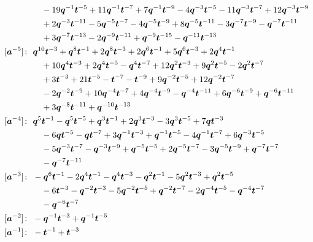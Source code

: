 \begin{align*}
& \quad -19 \bq^{-1} \bt^{-5} +11 \bq^{-1} \bt^{-7} +7 \bq^{-1} \bt^{-9} -4 \bq^{-3} \bt^{-5} -11 \bq^{-3} \bt^{-7} +12 \bq^{-3} \bt^{-9} \\
& \quad +2 \bq^{-3} \bt^{-11} -5 \bq^{-5} \bt^{-7} -4 \bq^{-5} \bt^{-9} +8 \bq^{-5} \bt^{-11} -3 \bq^{-7} \bt^{-9} -\bq^{-7} \bt^{-11} \\
& \quad +3 \bq^{-7} \bt^{-13} -2 \bq^{-9} \bt^{-11} +\bq^{-9} \bt^{-15} -\bq^{-11} \bt^{-13} \\
[\ba^{-5}]\colon\ & \bq^{10} \bt^{-3} +\bq^{8} \bt^{-1} +2 \bq^{8} \bt^{-3} +2 \bq^{6} \bt^{-1} +5 \bq^{6} \bt^{-3} +2 \bq^{4} \bt^{-1} \\
& \quad +10 \bq^{4} \bt^{-3} +2 \bq^{4} \bt^{-5} -\bq^{4} \bt^{-7} +12 \bq^{2} \bt^{-3} +9 \bq^{2} \bt^{-5} -2 \bq^{2} \bt^{-7} \\
& \quad +3 \bt^{-3} +21 \bt^{-5} -\bt^{-7} -\bt^{-9} +9 \bq^{-2} \bt^{-5} +12 \bq^{-2} \bt^{-7} \\
& \quad -2 \bq^{-2} \bt^{-9} +10 \bq^{-4} \bt^{-7} +4 \bq^{-4} \bt^{-9} -\bq^{-4} \bt^{-11} +6 \bq^{-6} \bt^{-9} +\bq^{-6} \bt^{-11} \\
& \quad +3 \bq^{-8} \bt^{-11} +\bq^{-10} \bt^{-13} \\
[\ba^{-4}]\colon\ & \bq^{5} \bt^{-1} -\bq^{5} \bt^{-5} +\bq^{3} \bt^{-1} +2 \bq^{3} \bt^{-3} -3 \bq^{3} \bt^{-5} +7 \bq \bt^{-3} \\
& \quad -6 \bq \bt^{-5} -\bq \bt^{-7} +3 \bq^{-1} \bt^{-3} +\bq^{-1} \bt^{-5} -4 \bq^{-1} \bt^{-7} +6 \bq^{-3} \bt^{-5} \\
& \quad -5 \bq^{-3} \bt^{-7} -\bq^{-3} \bt^{-9} +\bq^{-5} \bt^{-5} +2 \bq^{-5} \bt^{-7} -3 \bq^{-5} \bt^{-9} +\bq^{-7} \bt^{-7} \\
& \quad -\bq^{-7} \bt^{-11} \\
[\ba^{-3}]\colon\ & -\bq^{6} \bt^{-1} -2 \bq^{4} \bt^{-1} -\bq^{4} \bt^{-3} -\bq^{2} \bt^{-1} -5 \bq^{2} \bt^{-3} +\bq^{2} \bt^{-5} \\
& \quad -6 \bt^{-3} -\bq^{-2} \bt^{-3} -5 \bq^{-2} \bt^{-5} +\bq^{-2} \bt^{-7} -2 \bq^{-4} \bt^{-5} -\bq^{-4} \bt^{-7} \\
& \quad -\bq^{-6} \bt^{-7} \\
[\ba^{-2}]\colon\ & -\bq^{-1} \bt^{-3} +\bq^{-1} \bt^{-5} \\
[\ba^{-1}]\colon\ & -\bt^{-1} +\bt^{-3}
\end{align*}

